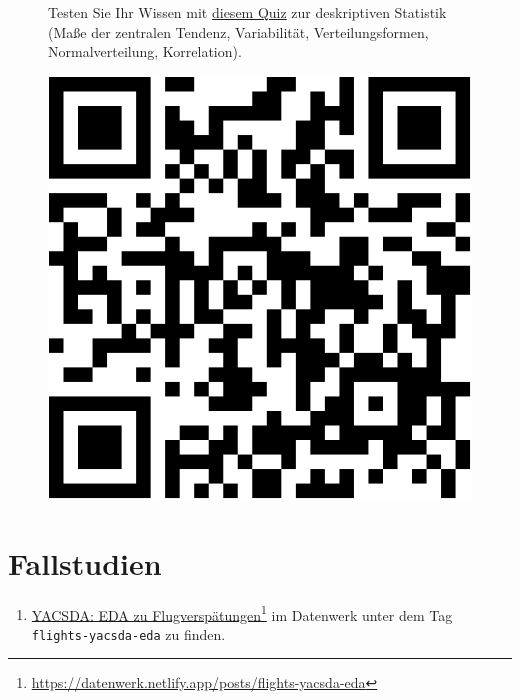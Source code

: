 \documentclass[
  letterpaper,
]{scrbook}
\providecommand{\tightlist}{%
  \setlength{\itemsep}{0pt}\setlength{\parskip}{0pt}}\usepackage{longtable,booktabs,array}
\theoremstyle{definition}
\theoremstyle{definition}
\theoremstyle{definition}
\theoremstyle{remark}
\begin{document}
\begin{figure}

\begin{minipage}{0.80\linewidth}
Testen Sie Ihr Wissen mit
\href{https://forms.gle/w7eTW3ftKy8Hv3nw8}{diesem Quiz} zur deskriptiven
Statistik (Maße der zentralen Tendenz, Variabilität, Verteilungsformen,
Normalverteilung, Korrelation).\end{minipage}%
%
\begin{minipage}{0.20\linewidth}

\begin{center}
\includegraphics[width=0.75\linewidth,height=\textheight,keepaspectratio]{070-zusammenhaenge_files/figure-pdf/unnamed-chunk-31-1.pdf}
\end{center}

\end{minipage}%

\end{figure}%

\section{Fallstudien}\label{fallstudien-1}

\begin{enumerate}
\def\labelenumi{\arabic{enumi}.}
\tightlist
\item
  \href{https://datenwerk.netlify.app/posts/flights-yacsda-eda/}{YACSDA:
  EDA zu Flugverspätungen}\footnote{\url{https://datenwerk.netlify.app/posts/flights-yacsda-eda}}
  im Datenwerk unter dem Tag \texttt{flights-yacsda-eda} zu finden.
\end{enumerate}
\end{document}
